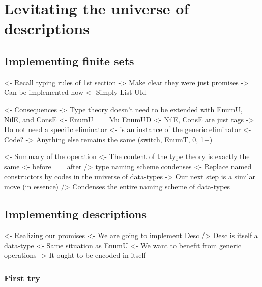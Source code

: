 \documentclass{article}
\newenvironment{structure}{\footnotesize\verbatim}{\endverbatim}
\begin{document}
\section{Levitating the universe of descriptions}

\subsection{Implementing finite sets}

\begin{structure}
<- Recall typing rules of 1st section
    -> Make clear they were just promises
    -> Can be implemented now
        <- Simply List UId
\end{structure}

\begin{structure}
<- Consequences
    -> Type theory doesn't need to be extended with EnumU, NilE, and ConsE
        <- EnumU == Mu EnumUD
        <- NilE, ConsE are just tags
    -> Do not need a specific \spi eliminator
        <- \spi is an instance of the generic eliminator
            <- Code?
    -> Anything else remains the same (switch, EnumT, 0, 1+)
\end{structure}

\begin{structure}
<- Summary of the operation
    <- The content of the type theory is exactly the same
        <- before == after
    /> type naming scheme condenses
        <- Replace named constructors by codes in the universe of data-types
    -> Our next step is a similar move (in essence)
        /> Condenses the entire naming scheme of data-types
\end{structure}

\subsection{Implementing descriptions}

\begin{structure}
<- Realizing our promises
    <- We are going to implement Desc
    /> Desc is itself a data-type
        <- Same situation as EnumU
            <- We want to benefit from generic operations
        -> It ought to be encoded in itself
\end{structure}

\subsubsection{First try}
\end{document}
